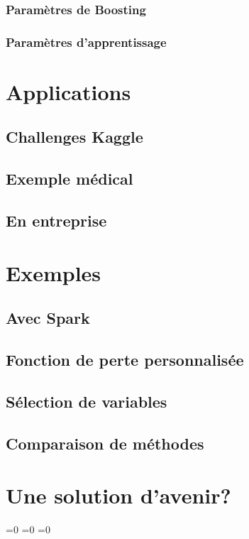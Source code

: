 \documentclass[11pt,a4paper]{article}
\begin{document}
\subsubsection{Paramètres de Boosting}
\subsubsection{Paramètres d'apprentissage}

\section{Applications}
\subsection{Challenges Kaggle}
\subsection{Exemple médical}
\subsection{En entreprise}

\section{Exemples}
\subsection{Avec Spark}
\subsection{Fonction de perte personnalisée}
\subsection{Sélection de variables}
\subsection{Comparaison de méthodes}

\section{Une solution d'avenir?}




%
%

\makeatletter
\ifnum{}=0
\clearpage
\else\ifnum{}=0
\clearpage
\else\ifnum{}=0
\clearpage
\fi\fi\fi

\end{document}
